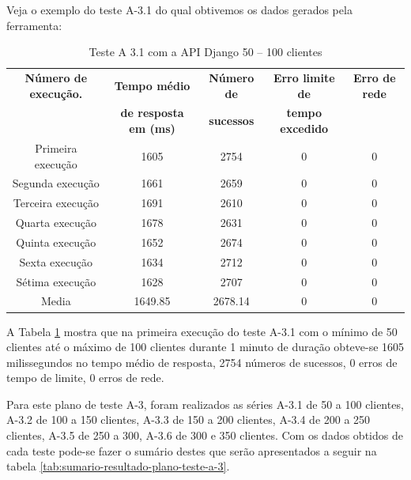  Veja o exemplo do teste A-3.1 do qual obtivemos os dados gerados pela ferramenta:

  \begin{table}[H]
    \centering
    \footnotesize
    \setlength{\abovecaptionskip}{0pt}
    \setlength{\belowcaptionskip}{0pt}
    \caption[Teste A-3.1 com a API Django 50 – 100 clientes]{Teste A 3.1 com a API Django 50 – 100 clientes}
    \label{tab:teste-a-3-1}
    \begin{tabular}{c|c|c|c|c}
      \hline \hline
      \textbf{Número de execução.} & \textbf{Tempo médio } &	\textbf{Número de } & \textbf{Erro limite de} & \textbf{Erro de rede}  \\
	    {}			   & \textbf{de resposta em (ms) } &\textbf{sucessos } & \textbf{tempo excedido} & {}  \\
      \hline \hline
      Primeira execução &	1605 &				2754 &			0 &				0 \\
      Segunda execução &	1661 &				2659 &			0 &				0 \\
      Terceira execução &	1691 &				2610 &			0 &				0 \\
      Quarta execução  &	1678 &				2631 &			0 &				0 \\
      Quinta execução  &	1652 &				2674 &			0 &				0 \\
      Sexta execução   &	1634 &				2712 &			0 &				0 \\
      Sétima execução  &	1628 &				2707 &			0 &				0 \\
      Media & 			1649.85 &			2678.14 & 		0 &				0 \\
      \hline \hline
    \end{tabular}
  \end{table}

  A Tabela \ref{tab:teste-a-3-1} mostra que na primeira execução do teste A-3.1 com o mínimo de 50 clientes até o máximo de 100 clientes
  durante 1 minuto de duração obteve-se 1605 milissegundos no tempo médio de resposta,
  2754 números de sucessos, 0 erros de tempo de limite, 0 erros de rede.

  Para este plano de teste A-3, foram realizados as séries A-3.1 de 50 a 100 clientes, A-3.2 de 100 a 150 clientes, A-3.3 de 150 a 200 clientes,
  A-3.4 de 200 a 250 clientes, A-3.5 de 250 a 300, A-3.6 de 300 e 350 clientes. Com os dados obtidos de cada teste pode-se fazer o sumário
  destes que serão apresentados a seguir na tabela \ref{tab:sumario-resultado-plano-teste-a-3}.

